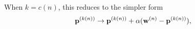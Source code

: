 \documentclass[fleqn,usenatbib]{mnras}
\begin{document}
        When $k=c(n)$, this reduces to the simpler form
        \begin{equation} \label{eq:app:som_BMU_update}
          \mathbf{p}^{(k(n))} \rightarrow \mathbf{p}^{(k(n))} + \alpha (\mathbf{w}^{(n)} - \mathbf{p}^{(k(n))}),
        \end{equation}




\label{lastpage}
\end{document}
